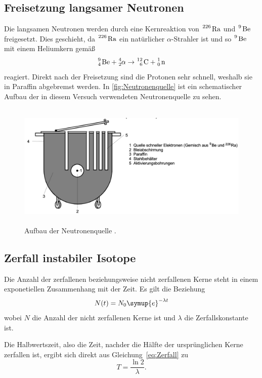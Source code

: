 \subsection{Freisetzung langsamer Neutronen}
\label{sec:Neutronenaktivierung}
Die langsamen Neutronen werden durch eine Kernreaktion von $\ce{^226 Ra}$ und $\ce{^9 Be}$ freigesetzt. Dies geschieht, da
$\ce{^226 Ra}$ ein natürlicher $\alpha$-Strahler ist und so $\ce{^9 Be}$ mit einem Heliumkern gemäß
\begin{equation*}
    \ce{^9_4 Be} + \ce{^4_2 } \alpha \to \ce{^12_6 C} + \ce{^1_0 n}
\end{equation*}
reagiert.
Direkt nach der Freisetzung sind die Protonen sehr schnell, weshalb sie in Paraffin abgebremst werden. In \autoref{fig:Neutronenquelle}
ist ein schematischer Aufbau der in diesem Versuch verwendeten Neutronenquelle zu sehen.
\begin{figure}[H]
    \centering
    \includegraphics[height=6cm]{content/pics/Neutronenquelle.png}
    \caption{Aufbau der Neutronenquelle \cite{v702}.}
    \label{fig:Neutronenquelle}
\end{figure}

\subsection{Zerfall instabiler Isotope}
Die Anzahl der zerfallenen beziehungsweise nicht zerfallenen Kerne steht in einem exponetiellen Zusammenhang mit der Zeit.
Es gilt die Beziehung
\begin{equation}
    N(t)=N_0\symup{e}^{-\lambda t} \label{eq:Zerfall}
\end{equation}
wobei $N$ die Anzahl der nicht zerfallenen Kerne ist und $\lambda$ die Zerfallskonstante ist.

Die Halbwertszeit, also die Zeit, nachder die Hälfte der ursprünglichen Kerne zerfallen ist, ergibt sich direkt aus
Gleichung~\eqref{eq:Zerfall} zu
\begin{equation}
    T = \frac{\ln 2}{\lambda}. \label{eq:Halbwertszeit}
\end{equation}
